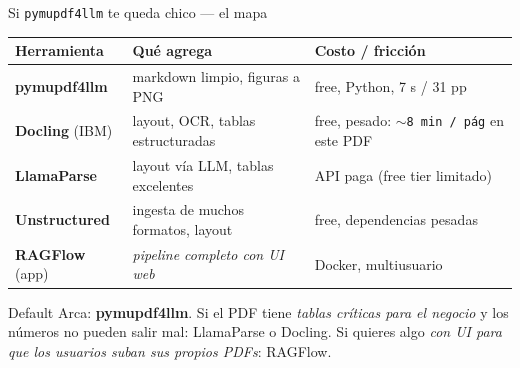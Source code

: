 \documentclass[aspectratio=169, 11pt]{beamer}
\begin{document}
\begin{frame}[shrink]{Si \texttt{pymupdf4llm} te queda chico --- el mapa}
  \vspace{6pt}
  \begin{center}
  \begin{tabular}{p{2.6cm} p{4.6cm} p{4.6cm}}
    \toprule
    \scriptsize\textbf{Herramienta} & \scriptsize\textbf{Qué agrega} & \scriptsize\textbf{Costo / fricción}\\
    \midrule
    \scriptsize\textbf{pymupdf4llm} & \scriptsize markdown limpio, figuras a PNG & \scriptsize free, Python, 7 s / 31 pp \\
    \scriptsize\textbf{Docling} (IBM) & \scriptsize layout, OCR, tablas estructuradas & \scriptsize free, pesado: \texttt{$\sim$8 min / pág} en este PDF \\
    \scriptsize\textbf{LlamaParse} & \scriptsize layout vía LLM, tablas excelentes & \scriptsize API paga (free tier limitado) \\
    \scriptsize\textbf{Unstructured} & \scriptsize ingesta de muchos formatos, layout & \scriptsize free, dependencias pesadas \\
    \scriptsize\textbf{RAGFlow} (app) & \scriptsize \emph{pipeline completo con UI web} & \scriptsize Docker, multiusuario \\
    \bottomrule
  \end{tabular}
  \end{center}
  \vspace{10pt}
  \begin{tcolorbox}[colback=arcaGray, colframe=arcaRed, leftrule=3pt,
    boxrule=0pt, sharp corners, left=8pt, right=8pt, top=4pt, bottom=4pt]
    {\footnotesize\color{arcaDark}
    Default Arca: \textbf{pymupdf4llm}. Si el PDF tiene \emph{tablas
    críticas para el negocio} y los números no pueden salir mal: LlamaParse o
    Docling. Si quieres algo \emph{con UI para que los usuarios suban sus
    propios PDFs}: RAGFlow.}
  \end{tcolorbox}
\end{frame}
\end{document}
